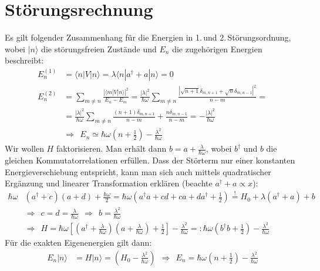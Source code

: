 \documentclass[a4paper,12pt]{article}
\newcommand{\braket}{}
\newcommand{\kla}{}
\newcommand{\klam}{}
\newcommand{\Ket}{}
\begin{document}
\section{Störungsrechnung}
Es gilt folgender Zusammenhang für die Energien in 1.\,und 2.\,Störungsordnung, wobei $\Ket | {n} \rangle$ die störungsfreien Zustände und $E_n$ die zugehörigen Energien beschreibt:
\begin{align*}
E_n^{(1)}&=\braket\langle {n} | {V} | {n}\rangle=\lambda\braket\langle {n} | {a^\dagger + a} | {n}\rangle=0\\
E_n^{(2)}&=\sum_{m\neq n}\frac{|\braket\langle {m} | {V} | {n}\rangle|^2}{E_n-E_m}=\frac{|\lambda|^2}{\hbar\omega}\sum_{m\neq n}\frac{|\sqrt{n+1}\delta_{m,n+1} + \sqrt{n}\delta_{m,n-1}|^2}{n-m}= \\
&=\frac{|\lambda|^2}{\hbar\omega}\sum_{m\neq n}\frac{(n+1)\delta_{m,n+1}}{n-m} + \frac{n\delta_{m,n-1}}{n-m}=-\frac{|\lambda|^2}{\hbar\omega} \\
&\Rightarrow\ \ E_n\simeq\hbar\omega\kla\left( {n+\frac{1}{2}} \right)-\frac{\lambda^2}{\hbar\omega}
\end{align*}
Wir wollen $H$ faktorisieren. Man erhält dann $b=a+\frac{\lambda}{\hbar\omega}$, wobei $b^\dagger$ und $b$ die gleichen Kommutatorrelationen erfüllen. Dass der Störterm nur einer konstanten Energieverschiebung entspricht, kann man sich auch mittels quadratischer Ergänzung und linearer Transformation erklären (beachte $a^\dagger +a\propto x$):
\begin{align*}
\hbar\omega &\kla\left( {a^\dagger+c} \right)\kla\left( {a+d} \right)+\frac{\hbar\omega}{2}=\hbar\omega\kla\left( { a^\dagger a+cd+ca+da^\dagger + \frac{1}{2}} \right) \overset{!}{=}H_0+\lambda\kla\left( {a^\dagger +a} \right)+b\\
&\Rightarrow\ \ c=d=\frac{\lambda}{\hbar\omega}\ \ \Rightarrow\ \ b=\frac{\lambda^2}{\hbar\omega}\\ 
&\Rightarrow\ \ H=\hbar\omega\klam\left[ {\kla\left( {a^\dagger +\frac{\lambda}{\hbar\omega}} \right)\kla\left( {a+\frac{\lambda}{\hbar\omega}} \right)+\frac{1}{2}} \right]-\frac{\lambda^2}{\hbar\omega}=:\hbar\omega\kla\left( {b^\dagger b+\frac{1}{2}} \right)-\frac{\lambda^2}{\hbar\omega}
\end{align*}
Für die exakten Eigenenergien gilt dann:
\begin{align*}
E_n\Ket | {n} \rangle&=H\Ket | {n} \rangle=\kla\left( {H_0-\frac{\lambda^2}{\hbar\omega}} \right)\ \ \Rightarrow\ \ E_n=\hbar\omega\kla\left( {n+\frac{1}{2}} \right)-\frac{\lambda^2}{\hbar\omega}
\end{align*}
\end{document}
